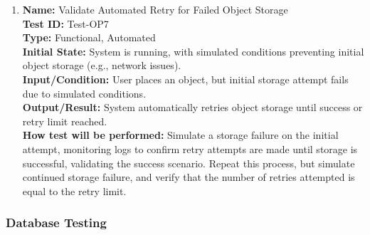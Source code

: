 \documentclass[12pt, titlepage]{article}
\begin{document}
\begin{enumerate}
  \item \textbf{Name:} Validate Automated Retry for Failed Object Storage \label{itm:Test-OP7} \\
        \textbf{Test ID:} Test-OP7 \\
        \textbf{Type:} Functional, Automated \\
        \textbf{Initial State:} System is running, with simulated conditions preventing initial object storage (e.g., network issues). \\
        \textbf{Input/Condition:} User places an object, but initial storage attempt fails due to simulated conditions. \\
        \textbf{Output/Result:} System automatically retries object storage until success or retry limit reached. \\
        \textbf{How test will be performed:} Simulate a storage failure on the initial attempt, monitoring logs to confirm retry attempts are made until storage is successful, validating the success scenario. Repeat this process, but simulate continued storage failure, and verify that the number of retries attempted is equal to the retry limit.

\end{enumerate}

\subsubsection{Database Testing}
\end{document}
